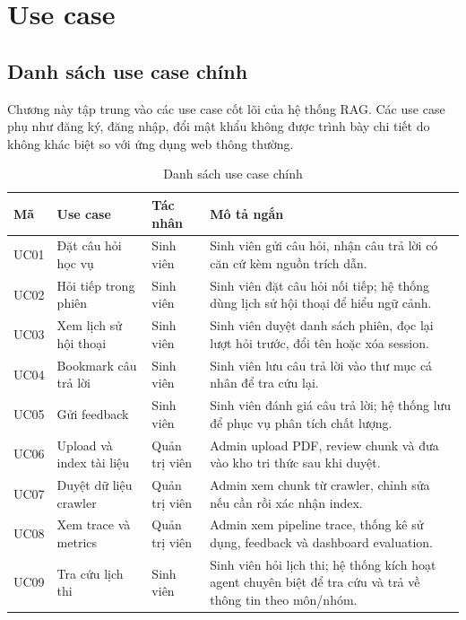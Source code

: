 \documentclass[../DoAn.tex]{subfiles}
\begin{document}
\section{Use case}

\subsection{Danh sách use case chính}

Chương này tập trung vào các use case cốt lõi của hệ thống RAG. Các use case
phụ như đăng ký, đăng nhập, đổi mật khẩu không được trình bày chi tiết do
không khác biệt so với ứng dụng web thông thường.

\begin{table}[H]
\centering
\small
\begin{tabular}{|p{1.2cm}|p{3.8cm}|p{2.8cm}|p{5.8cm}|}
\hline
\textbf{Mã} & \textbf{Use case} & \textbf{Tác nhân} & \textbf{Mô tả ngắn} \\
\hline
UC01 & Đặt câu hỏi học vụ & Sinh viên & Sinh viên gửi câu hỏi, nhận câu trả
lời có căn cứ kèm nguồn trích dẫn. \\
\hline
UC02 & Hỏi tiếp trong phiên & Sinh viên & Sinh viên đặt câu hỏi nối tiếp;
hệ thống dùng lịch sử hội thoại để hiểu ngữ cảnh. \\
\hline
UC03 & Xem lịch sử hội thoại & Sinh viên & Sinh viên duyệt danh sách phiên,
đọc lại lượt hỏi trước, đổi tên hoặc xóa session. \\
\hline
UC04 & Bookmark câu trả lời & Sinh viên & Sinh viên lưu câu trả lời vào thư
mục cá nhân để tra cứu lại. \\
\hline
UC05 & Gửi feedback & Sinh viên & Sinh viên đánh giá câu trả lời; hệ thống
lưu để phục vụ phân tích chất lượng. \\
\hline
UC06 & Upload và index tài liệu & Quản trị viên & Admin upload PDF, review
chunk và đưa vào kho tri thức sau khi duyệt. \\
\hline
UC07 & Duyệt dữ liệu crawler & Quản trị viên & Admin xem chunk từ crawler,
chỉnh sửa nếu cần rồi xác nhận index. \\
\hline
UC08 & Xem trace và metrics & Quản trị viên & Admin xem pipeline trace, thống
kê sử dụng, feedback và dashboard evaluation. \\
\hline
UC09 & Tra cứu lịch thi & Sinh viên & Sinh viên hỏi lịch thi; hệ thống kích
hoạt agent chuyên biệt để tra cứu và trả về thông tin theo môn/nhóm. \\
\hline
\end{tabular}
\caption{Danh sách use case chính}
\end{table}
\end{document}
